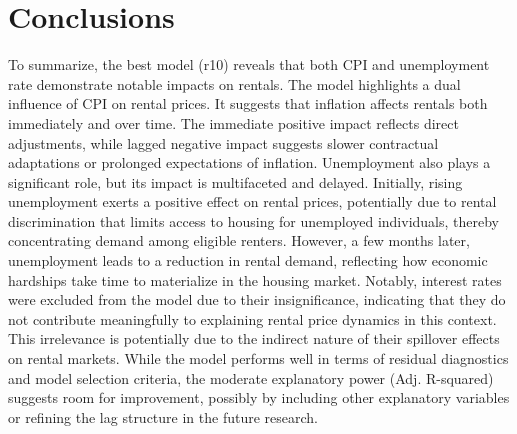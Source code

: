 \documentclass[12pt, times]{article}
\begin{document}
\section{Conclusions}
To summarize, the best model (r10) reveals that both CPI and unemployment rate demonstrate notable impacts on rentals. The model highlights a dual influence of CPI on rental prices. It suggests that inflation affects rentals both immediately and over time. The immediate positive impact reflects direct adjustments, while lagged negative impact suggests slower contractual adaptations or prolonged expectations of inflation. Unemployment also plays a significant role, but its impact is multifaceted and delayed. Initially, rising unemployment exerts a positive effect on rental prices, potentially due to rental discrimination that limits access to housing for unemployed individuals, thereby concentrating demand among eligible renters. However, a few months later, unemployment leads to a reduction in rental demand, reflecting how economic hardships take time to materialize in the housing market. Notably, interest rates were excluded from the model due to their insignificance, indicating that they do not contribute meaningfully to explaining rental price dynamics in this context. This irrelevance is potentially due to the indirect nature of their spillover effects on rental markets. While the model performs well in terms of residual diagnostics and model selection criteria, the moderate explanatory power (Adj. R-squared) suggests room for improvement, possibly by including other explanatory variables or refining the lag structure in the future research.


\clearpage
\newpage
{}
%



\end{document}

